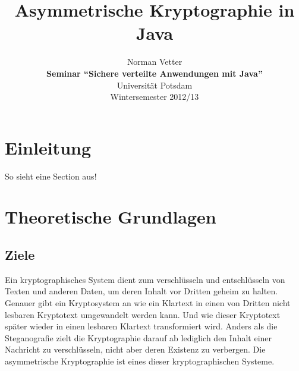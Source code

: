 \documentclass[paper=a4,11pt,german]{scrartcl} %
\begin{document}
%
\title{Asymmetrische Kryptographie in Java}

\author{Norman Vetter\\
\textbf{Seminar "`Sichere verteilte Anwendungen mit Java"'}\\
Universität Potsdam\\
Wintersemester 2012/13}

\date{}

\maketitle

%
\newpage
\tableofcontents
\newpage
\section{Einleitung}
So sieht eine Section aus!

\section{Theoretische Grundlagen}

\subsection{Ziele}
Ein kryptographisches System dient zum verschlüsseln und entschlüsseln von Texten und anderen Daten, um deren Inhalt vor Dritten geheim zu halten. Genauer gibt ein Kryptosystem an wie ein Klartext in einen von Dritten nicht lesbaren Kryptotext umgewandelt werden kann. Und wie dieser Kryptotext später wieder in einen lesbaren Klartext transformiert wird. Anders als die Steganografie zielt die Kryptographie darauf ab lediglich den Inhalt einer Nachricht zu verschlüsseln, nicht aber deren Existenz zu verbergen. Die asymmetrische Kryptographie ist eines dieser kryptographischen Systeme.
\end{document}
